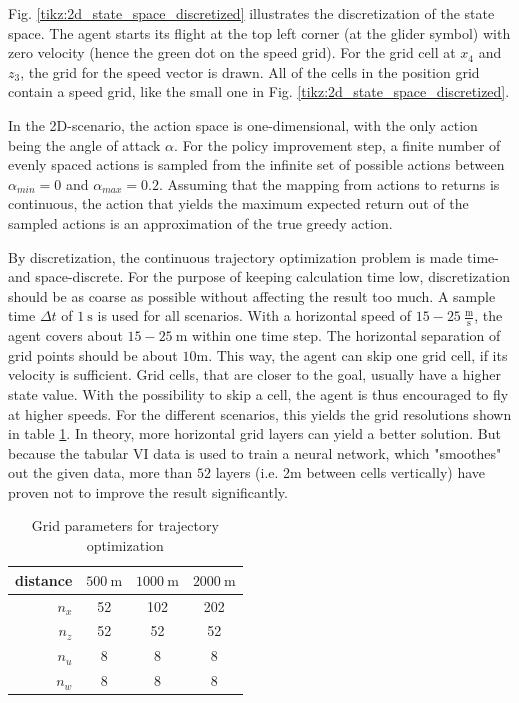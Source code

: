 Fig. \ref{tikz:2d_state_space_discretized} illustrates the discretization of the state space. The agent starts its flight at the top left corner (at the glider symbol) with zero velocity (hence the green dot on the speed grid). For the grid cell at $x_4$ and $z_3$, the grid for the speed vector is drawn. All of the cells in the position grid contain a speed grid, like the small one in Fig. \ref{tikz:2d_state_space_discretized}.

In the 2D-scenario, the action space is one-dimensional, with the only action being the angle of attack $\alpha$. For the policy improvement step, a finite number of evenly spaced actions is sampled from the infinite set of possible actions between $\alpha_{min} = 0$ and $\alpha_{max}=0.2$. Assuming that the mapping from actions to returns is continuous, the action that yields the maximum expected return out of the sampled actions is an approximation of the true greedy action.

By discretization, the continuous trajectory optimization problem is made time- and space-discrete. For the purpose of keeping calculation time low, discretization should be as coarse as possible without affecting the result too much. A sample time $\Delta t$ of $1~\text{s}$ is used for all scenarios. With a horizontal speed of $15-25 ~\frac{\text{m}}{\text{s}}$, the agent covers about $15-25~\text{m}$ within one time step. The horizontal separation of grid points should be about $10$m. This way, the agent can skip one grid cell, if its velocity is sufficient. Grid cells, that are closer to the goal, usually have a higher state value. With the possibility to skip a cell, the agent is thus encouraged to fly at higher speeds. For the different scenarios, this yields the grid resolutions shown in table \ref{tab:grids}. In theory, more horizontal grid layers can yield a better solution. But because the tabular VI data is used to train a neural network, which "smoothes" out the given data, more than $52$ layers (i.e. 2m between cells vertically) have proven not to improve the result significantly.

\begin{table}
	\begin{center}
		\begin{tabular}{r|c c c}
			distance & $500~\text{m}$ & $1000~\text{m}$ & $2000~\text{m}$ \\ \hline
			$n_x$ & 52 & 102 & 202 \\
			$n_z$ & 52 & 52 & 52\\
			$n_u$ & 8 & 8 & 8 \\
			$n_w$ & 8 & 8 & 8
		\end{tabular}
	\end{center}
	\caption{Grid parameters for trajectory optimization}
	\label{tab:grids}
\end{table}

